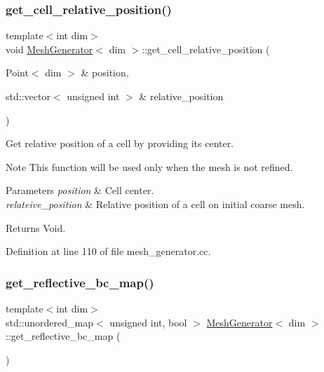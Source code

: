\subsubsection{\texorpdfstring{get\+\_\+cell\+\_\+relative\+\_\+position()}{get\_cell\_relative\_position()}}
{\footnotesize\ttfamily template$<$int dim$>$ \\
void \hyperlink{class_mesh_generator}{Mesh\+Generator}$<$ dim $>$\+::get\+\_\+cell\+\_\+relative\+\_\+position (\begin{DoxyParamCaption}\item[{Point$<$ dim $>$ \&}]{position,  }\item[{std\+::vector$<$ unsigned int $>$ \&}]{relative\+\_\+position }\end{DoxyParamCaption})\hspace{0.3cm}{\ttfamily [private]}}

Get relative position of a cell by providing its center.

\begin{DoxyNote}{Note}
This function will be used only when the mesh is not refined.
\end{DoxyNote}

\begin{DoxyParams}{Parameters}
{\em position} & Cell center. \\
\hline
{\em relateive\+\_\+position} & Relative position of a cell on initial coarse mesh. \\
\hline
\end{DoxyParams}
\begin{DoxyReturn}{Returns}
Void. 
\end{DoxyReturn}


Definition at line 110 of file mesh\+\_\+generator.\+cc.

\mbox{\label{class_mesh_generator_a525754e676dca1ed4ffac34f63a5d1ae}} 
\subsubsection{\texorpdfstring{get\+\_\+reflective\+\_\+bc\+\_\+map()}{get\_reflective\_bc\_map()}}
{\footnotesize\ttfamily template$<$int dim$>$ \\
std\+::unordered\+\_\+map$<$ unsigned int, bool $>$ \hyperlink{class_mesh_generator}{Mesh\+Generator}$<$ dim $>$\+::get\+\_\+reflective\+\_\+bc\+\_\+map (\begin{DoxyParamCaption}{ }\end{DoxyParamCaption})}

